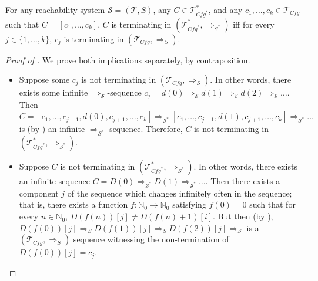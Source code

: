 \documentclass{article}
\newcommand{\Tcfg}{\mathcal{T}_{\mathit{Cfg}}}
\begin{document}
\begin{lemma}\label{lem:terminationComposite}
    For any reachability system $\mathcal{S} = (\mathcal{T}, S)$, any $C \in \mathcal{T}^*_{\mathit{Cfg}^*}$,
    and any $c_1,\ldots,c_k \in \Tcfg$ such that
    $C = [c_1,\ldots,c_k]$, $C$ is terminating in $(\mathcal{T}^*_{\mathit{Cfg}^*}, \Rightarrow_{S^*})$
    iff for every $j \in \{ 1, \ldots, k \}$, $c_j$ is terminating in $(\Tcfg, \Rightarrow_S)$.
\end{lemma}
\begin{proof}[Proof of ]
We prove both implications separately, by contraposition.
\begin{itemize}
    \item Suppose some $c_j$ is not terminating in $(\Tcfg, \Rightarrow_S)$.
    In other words, there exists some infinite $\Rightarrow_{\mathcal{S}}$-sequence
    $c_j = d(0) \Rightarrow_{\mathcal{S}} d(1) \Rightarrow_{\mathcal{S}} d(2) \Rightarrow_{\mathcal{S}} \ldots$.
    Then $C = [c_1,\ldots,c_{j-1}, d(0), c_{j+1}, \ldots, c_k] \Rightarrow_{\mathcal{S}^*}
    [c_1,\ldots,c_{j-1}, d(1), c_{j+1}, \ldots, c_k] \Rightarrow_{\mathcal{S}^*} \ldots$
    is (by ) an infinite $\Rightarrow_{\mathcal{S}^*}$-sequence.
    Therefore, $C$ is not terminating in $(\mathcal{T}^*_{\mathit{Cfg}^*}, \Rightarrow_{S^*})$.
    \item Suppose $C$ is not terminating in $(\mathcal{T}^*_{\mathit{Cfg}^*}, \Rightarrow_{S^*})$.
    In other words, there exists an infinite sequence $C = D(0) \Rightarrow_{\mathcal{S}^*} D(1) \Rightarrow_{\mathcal{S}^*} \ldots$.
    Then there exists a component $j$ of the sequence which changes infinitely often in the sequence;
    that is, there exists a function $f : \mathbb{N}_0 \to \mathbb{N}_0$ satisfying $f(0) = 0$
    such that for every $n \in \mathbb{N}_0$,
    $D(f(n))[j] \not = D(f(n)+1)[i]$.
    But then (by ), $D(f(0))[j] \Rightarrow_S D(f(1))[j] \Rightarrow_S D(f(2))[j] \Rightarrow_S$
    is a $(\Tcfg, \Rightarrow_S)$ sequence witnessing the non-termination of $D(f(0))[j] = c_j$.
\end{itemize}
\end{proof}
\end{document}
